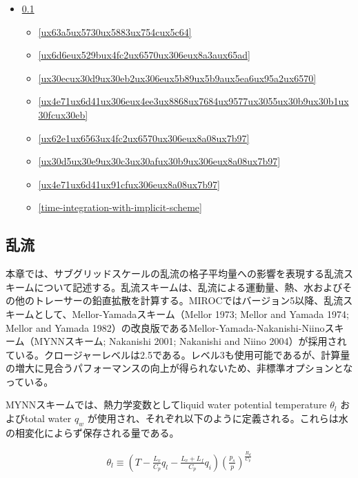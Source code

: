 \begin{itemize}
\tightlist
\item
  \ref{ux4e71ux6d41}

  \begin{itemize}
  \tightlist
  \item
    \ref{ux63a5ux5730ux5883ux754cux5c64}
  \item
    \ref{ux6d6eux529bux4fc2ux6570ux306eux8a3aux65ad}
  \item
    \ref{ux30ecux30d9ux30eb2ux306eux5b89ux5b9aux5ea6ux95a2ux6570}
  \item
    \ref{ux4e71ux6d41ux306eux4ee3ux8868ux7684ux9577ux3055ux30b9ux30b1ux30fcux30eb}
  \item
    \ref{ux62e1ux6563ux4fc2ux6570ux306eux8a08ux7b97}
  \item
    \ref{ux30d5ux30e9ux30c3ux30afux30b9ux306eux8a08ux7b97}
  \item
    \ref{ux4e71ux6d41ux91cfux306eux8a08ux7b97}
  \item
    \ref{time-integration-with-implicit-scheme}
  \end{itemize}
\end{itemize}

\hypertarget{ux4e71ux6d41}{%
\subsection{乱流}\label{ux4e71ux6d41}}

本章では、サブグリッドスケールの乱流の格子平均量への影響を表現する乱流スキームについて記述する。乱流スキームは、乱流による運動量、熱、水およびその他のトレーサーの鉛直拡散を計算する。MIROCではバージョン5以降、乱流スキームとして、Mellor-Yamadaスキーム（Mellor
1973; Mellor and Yamada 1974; Mellor and Yamada
1982）の改良版であるMellor-Yamada-Nakanishi-Niinoスキーム（MYNNスキーム;
Nakanishi 2001; Nakanishi and Niino
2004）が採用されている。クロージャーレベルは2.5である。レベル3も使用可能であるが、計算量の増大に見合うパフォーマンスの向上が得られないため、非標準オプションとなっている。

MYNNスキームでは、熱力学変数としてliquid water potential temperature
\(\theta_l\) およびtotal water \(q_w\)
が使用され、それぞれ以下のように定義される。これらは水の相変化によらず保存される量である。

\begin{eqnarray} \theta_l \equiv \left(T - \frac{L_v}{C_p}q_l - \frac{L_v+L_f}{C_p}q_i \right) \left(\frac{p_s}{p}\right)^{\frac{R_d}{C_p}} \end{eqnarray}

